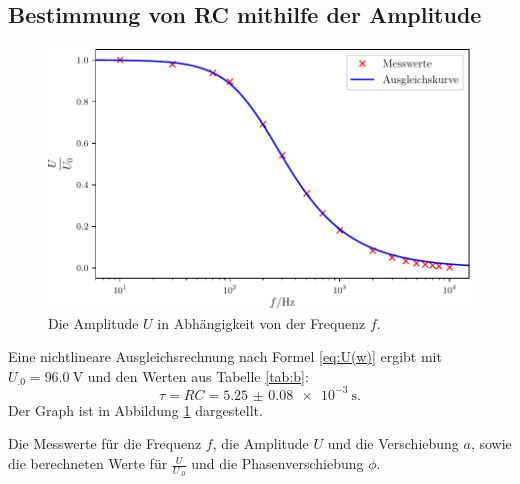 \subsection{Bestimmung von RC mithilfe der Amplitude}

\begin{figure}
	\centering
	\includegraphics[width=\linewidth-70pt,height=\textheight-70pt,keepaspectratio]{content/images/Graph2.pdf}
	\caption{Die Amplitude $U$ in Abhängigkeit von der Frequenz $f$.}
	\label{fig:Graph2}
\end{figure}

\noindent Eine nichtlineare Ausgleichsrechnung nach Formel \eqref{eq:U(w)} ergibt mit $U_.0 = \SI{96.0}{\volt}$ und den Werten aus Tabelle \ref{tab:b}:
\[
\tau = RC = \SI{5.25(8)e-3}{\second}\text{.}
\]
Der Graph ist in Abbildung \ref{fig:Graph2} dargestellt.

\begin{table}
	\centering
	\caption{Die Messwerte für die Frequenz $f$, die Amplitude $U$ und die Verschiebung $a$, sowie die berechneten Werte für $\frac{U}{U_.0}$ und die Phasenverschiebung $\phi$.}
	
	\label{tab:b}
\end{table}

